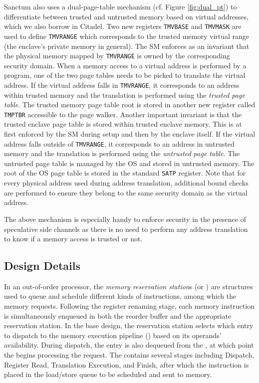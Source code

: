 Sanctum also uses a dual-page-table mechanism (cf. Figure \ref{fig:dual_pt}) to differentiate between trusted and untrusted memory based on virtual addresses, which we also borrow in Citadel. 
Two new registers \texttt{TMVBASE} and \texttt{TMVMASK} are used to define \texttt{TMVRANGE} which corresponds to the trusted memory virtual range (the enclave's private memory in general).
The SM enforces as an invariant that the physical memory mapped by \texttt{TMVRANGE} is owned by the corresponding security domain.
When a memory access to a virtual address is performed by a program, one of the two page tables needs to be picked to translate the virtual address.
If the virtual address falls in \texttt{TMVRANGE}, it corresponds to an address within trusted memory and the translation is performed using the \emph{trusted page table}.
The trusted memory page table root is stored in another new register called \texttt{TMPTBR} accessible to the page walker.
Another important invariant is that the trusted enclave page table is stored within trusted enclave memory.
This is at first enforced by the SM during setup and then by the enclave itself.
If the virtual address falls outside of \texttt{TMVRANGE}, it corresponds to an address in untrusted memory and the translation is performed using the \emph{untrusted page table}.
The untrusted page table is managed by the OS and stored in untrusted memory.
The root of the OS page table is stored in the standard \texttt{SATP} register.
Note that for every physical address used during address translation, additional bound checks are performed to ensure they belong to the same security domain as the virtual address.


The above mechanism is especially handy to enforce security in the presence of speculative side channels
as there is no need to perform any address translation to know if a memory access is trusted or not.

\subsection{Design Details}

In an out-of-order processor, the \textit{memory reservation station}s (or \MemRS{}) are structures used to queue and schedule different kinds of instructions, among which the memory requests. 
Following the register renaming stage, each memory instruction is simultaneously enqueued in both the reorder buffer and the appropriate reservation station. 
In the base design, the reservation station selects which entry to dispatch to the memory execution pipeline (\MemExePipeline{}) based on its operands' availability. 
During dispatch, the entry is also dequeued from the \MemRS{}, at which point the \MemExePipeline{} begins processing the request. 
The \MemExePipeline{} contains several stages 
including Dispatch, Register Read, Translation Execution, and Finish, after which the instruction is placed in the load/store queue to be scheduled and sent to memory.

